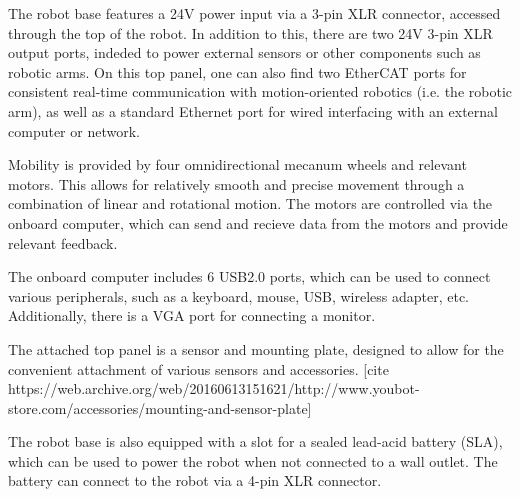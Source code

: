 \documentclass[a4paper, 12pt]{article}
\begin{document}
    The robot base features a 24V power input via a 3-pin XLR connector, accessed through the top of the robot. In addition to this, there are two 24V 3-pin XLR output ports, indeded to power external sensors or other components such as robotic arms. On this top panel, one can also find two EtherCAT ports for consistent real-time communication with motion-oriented robotics (i.e. the robotic arm), as well as a standard Ethernet port for wired interfacing with an external computer or network. 

    Mobility is provided by four omnidirectional mecanum wheels and relevant motors. This allows for relatively smooth and precise movement through a combination of linear and rotational motion. The motors are controlled via the onboard computer, which can send and recieve data from the motors and provide relevant feedback.

    The onboard computer includes 6 USB2.0 ports, which can be used to connect various peripherals, such as a keyboard, mouse, USB, wireless adapter, etc. Additionally, there is a VGA port for connecting a monitor. \cite{githubYoubotOverview}  

    The attached top panel is a sensor and mounting plate, designed to allow for the convenient attachment of various sensors and accessories. [cite https://web.archive.org/web/20160613151621/http://www.youbot-store.com/accessories/mounting-and-sensor-plate]

    The robot base is also equipped with a slot for a sealed lead-acid battery (SLA), which can be used to power the robot when not connected to a wall outlet. The battery can connect to the robot via a 4-pin XLR connector. 
\end{document}
